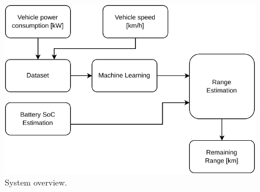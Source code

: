 \begin{figure}[H]
    \begin{center}
        \includegraphics[scale=1.0]{../figures/generic_diagram}
        \caption{System overview.}
    \end{center}
\end{figure}

